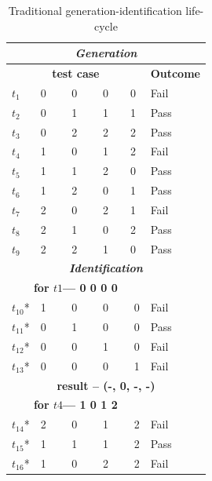 \documentclass{sig-alternate}
\begin{document}
\begin{table}[h]
\caption{Traditional generation-identification life-cycle}
\label{tradition-gi}
\center
\begin{tabular}{llllll}
\hline
\multicolumn{6}{c}{\bfseries \emph{Generation}} \\
\hline
\multicolumn{5}{c}{\bfseries test case} & \bfseries Outcome \\
 $t_{1}$ & \multicolumn{4}{l}{0 \ \ \ \ 0 \ \ \ \  0\ \ \ \ 0} & Fail \\
 $t_{2}$ & \multicolumn{4}{l}{0 \ \ \ \ 1 \ \ \ \  1\ \ \ \ 1} & Pass \\
 $t_{3}$ & \multicolumn{4}{l}{0 \ \ \ \ 2 \ \ \ \  2\ \ \ \ 2} & Pass \\
 $t_{4}$ & \multicolumn{4}{l}{1 \ \ \ \ 0 \ \ \ \  1\ \ \ \ 2} & Fail \\
 $t_{5}$ & \multicolumn{4}{l}{1 \ \ \ \ 1 \ \ \ \  2\ \ \ \ 0} & Pass \\
 $t_{6}$ & \multicolumn{4}{l}{1 \ \ \ \ 2 \ \ \ \  0\ \ \ \ 1} & Pass \\
 $t_{7}$ & \multicolumn{4}{l}{2 \ \ \ \ 0 \ \ \ \  2\ \ \ \ 1} & Fail \\
 $t_{8}$ & \multicolumn{4}{l}{2 \ \ \ \ 1 \ \ \ \  0\ \ \ \ 2} & Pass \\
 $t_{9}$ & \multicolumn{4}{l}{2 \ \ \ \ 2 \ \ \ \  1\ \ \ \ 0} & Pass \\
 \hline
\multicolumn{6}{c}{\bfseries \emph{Identification}}  \\
\hline
\multicolumn{5}{c}{\bfseries for $t1$--- 0 0 0 0} &  \\
$t_{10}$* &\multicolumn{4}{l}{1  \ \ \ \  0 \ \ \ \  0 \ \ \ \  0} & Fail \\
$t_{11}$* &\multicolumn{4}{l}{0  \ \ \ \  1 \ \ \ \  0 \ \ \ \  0} & Pass \\
$t_{12}$* &\multicolumn{4}{l}{0  \ \ \ \  0 \ \ \ \  1  \ \ \ \ 0} & Fail \\
$t_{13}$* &\multicolumn{4}{l}{0  \ \ \ \  0 \ \ \ \  0  \ \ \ \ 1} & Fail \\
\multicolumn{6}{c}{\bfseries result --  (-, 0, -, -)}  \\
\multicolumn{5}{c}{\bfseries for $t4$--- 1 0 1 2} &  \\
$t_{14}$* &\multicolumn{4}{l}{2  \ \ \ \  0 \ \ \ \  1 \ \ \ \  2} & Fail \\
$t_{15}$* &\multicolumn{4}{l}{1  \ \ \ \  1 \ \ \ \  1 \ \ \ \  2} & Pass \\
$t_{16}$* &\multicolumn{4}{l}{1  \ \ \ \  0 \ \ \ \  2  \ \ \ \ 2} & Fail \\

\end{tabular}
\end{table}
\end{document}
